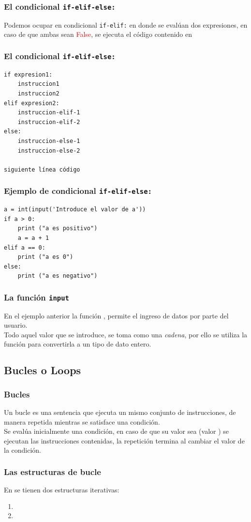 \documentclass[12pt]{beamer}
\begin{document}
\begin{frame}[fragile]
\frametitle{El condicional \texttt{if-elif-else:}}
Podemos ocupar en condicional \texttt{if-elif:} en donde se evalúan dos expresiones, en caso de que ambas sean \textcolor{red}{False}, se ejecuta el código contenido en 
\end{frame}
\begin{frame}[fragile]
\frametitle{El condicional \texttt{if-elif-else:}}
\fontsize{12}{12}\selectfont
\begin{verbatim}
if expresion1:
    instruccion1
    instruccion2
elif expresion2:
    instruccion-elif-1
    instruccion-elif-2
else:
    instruccion-else-1
    instruccion-else-2

siguiente línea código
\end{verbatim}
\end{frame}
\begin{frame}[fragile]
\frametitle{Ejemplo de condicional \texttt{if-elif-else:}}
\begin{lstlisting}[caption=Ejemplo de un condicionla if-elif-else]
a = int(input('Introduce el valor de a'))
if a > 0:
    print ("a es positivo")
    a = a + 1
elif a == 0: 
    print ("a es 0")
else:
    print ("a es negativo")
\end{lstlisting}
\end{frame}
\begin{frame}
\frametitle{La función \texttt{input}}
En el ejemplo anterior la función , permite el ingreso de datos por parte del usuario.
\\
\bigskip
\pause
Todo aquel valor que se introduce, se toma como una \emph{cadena}, por ello se utiliza la función  para convertirla a un tipo de dato entero.
\end{frame}

\subsection{Bucles o Loops}

\begin{frame}
\frametitle{Bucles}
Un bucle es una sentencia que ejecuta un mismo conjunto de instrucciones, de manera repetida mientras se satisface una condición.
\\
\bigskip
Se evalúa inicialmente una condición, en caso de que su valor sea (valor ) se ejecutan las instrucciones contenidas, \pause la repetición termina al cambiar el valor de la condición.
\end{frame}
\begin{frame}
\frametitle{Las estructuras de bucle}
En \python{} se tienen dos estructuras iterativas:
\begin{enumerate}[<+->]
\item {}
\item {}
\end{enumerate}
\end{frame}
\end{document}
